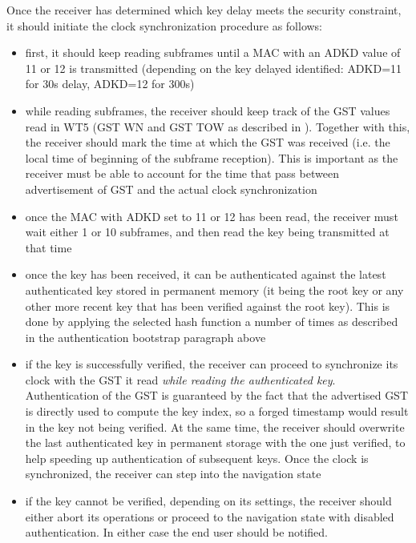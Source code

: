 Once the receiver has determined which key delay meets the security constraint,
it should initiate the clock synchronization procedure as follows:
\begin{itemize}
  \item first, it should keep reading subframes until a MAC with an ADKD value
    of 11 or 12 is transmitted (depending on the key delayed identified:
    \textrm{ADKD=11} for \num{30}\si{s} delay, \textrm{ADKD=12} for
    \num{300}\si{s})
  \item while reading subframes, the receiver should keep track of the GST
    values read in WT5 (GST WN and GST TOW as described in \cite{galileoicd}).
    Together with this, the receiver should mark the time at which the GST was
    received (i.e. the local time of beginning of the subframe reception).
    This is important as the receiver must be able to account for the time that
    pass between advertisement of GST and the actual clock synchronization
  \item once the MAC with ADKD set to 11 or 12 has been read, the receiver must
    wait either 1 or 10 subframes, and then read the key being transmitted at
    that time
  \item once the key has been received, it can be authenticated against the
    latest authenticated key stored in permanent memory (it being the root key
    or any other more recent key that has been verified against the root key).
    This is done by applying the selected hash function a number of times as
    described in the authentication bootstrap paragraph above
  \item if the key is successfully verified, the receiver can proceed to
    synchronize its clock with the GST it read \textit{while reading the
    authenticated key}. Authentication of the GST is guaranteed by the fact that
    the advertised GST is directly used to compute the key index, so a forged
    timestamp would result in the key not being verified. At the same time, the
    receiver should overwrite the last authenticated key in permanent storage
    with the one just verified, to help speeding up authentication of subsequent
    keys. Once the clock is synchronized, the receiver can step into the
    navigation state
  \item if the key cannot be verified, depending on its settings, the receiver
    should either abort its operations or proceed to the navigation state with
    disabled authentication. In either case the end user should be notified.
\end{itemize}

